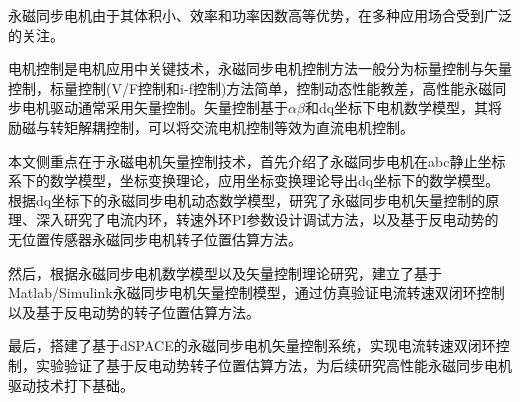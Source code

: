 \begin{abstractCn}

	永磁同步电机由于其体积小、效率和功率因数高等优势，在多种应用场合受到广泛的关注。
	
	电机控制是电机应用中关键技术，永磁同步电机控制方法一般分为标量控制与矢量控制，标量控制(V/F控制和i-f控制)方法简单，控制动态性能教差，高性能永磁同步电机驱动通常采用矢量控制。矢量控制基于$\alpha\beta$和dq坐标下电机数学模型，其将励磁与转矩解耦控制，可以将交流电机控制等效为直流电机控制。
	
	本文侧重点在于永磁电机矢量控制技术，首先介绍了永磁同步电机在abc静止坐标系下的数学模型，坐标变换理论，应用坐标变换理论导出dq坐标下的数学模型。根据dq坐标下的永磁同步电机动态数学模型，研究了永磁同步电机矢量控制的原理、深入研究了电流内环，转速外环PI参数设计调试方法，以及基于反电动势的无位置传感器永磁同步电机转子位置估算方法。
	
	然后，根据永磁同步电机数学模型以及矢量控制理论研究，建立了基于Matlab/Simulink永磁同步电机矢量控制模型，通过仿真验证电流转速双闭环控制以及基于反电动势的转子位置估算方法。
	
	最后，搭建了基于dSPACE的永磁同步电机矢量控制系统，实现电流转速双闭环控制，实验验证了基于反电动势转子位置估算方法，为后续研究高性能永磁同步电机驱动技术打下基础。

\end{abstractCn}
